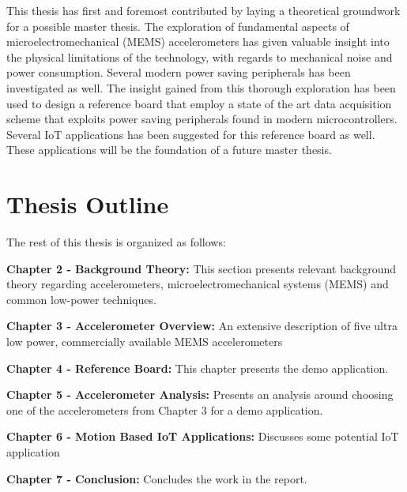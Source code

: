 This thesis has first and foremost contributed by laying a theoretical groundwork for a possible master thesis. The exploration of fundamental aspects of microelectromechanical (MEMS) accelerometers has given valuable insight into the physical limitations of the technology, with regards to mechanical noise and power consumption. Several modern power saving peripherals has been investigated as well. The insight gained from this thorough exploration has been used to design a reference board that employ a state of the art data acquisition scheme that exploits power saving peripherals found in modern microcontrollers. Several IoT applications has been suggested for this reference board as well. These applications will be the foundation of a future master thesis.

\newpage

\section{Thesis Outline}

The rest of this thesis is organized as follows:

\textbf{Chapter 2 - Background Theory:} This section presents relevant background theory regarding accelerometers, microelectromechanical systems (MEMS) and common low-power techniques.  

\textbf{Chapter 3 - Accelerometer Overview:} An extensive description of five ultra low power, commercially available MEMS accelerometers

\textbf{Chapter 4 - Reference Board:} This chapter presents the demo application.

\textbf{Chapter 5 - Accelerometer Analysis:} Presents an analysis around choosing one of the accelerometers from Chapter 3 for a demo application.

\textbf{Chapter 6 - Motion Based IoT Applications:} Discusses some potential IoT application

\textbf{Chapter 7 - Conclusion:} Concludes the work in the report.


